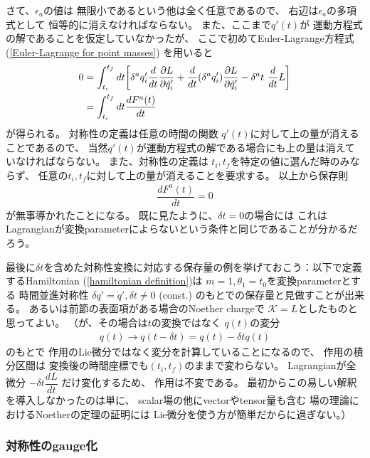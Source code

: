さて、$\epsilon_a$の値は
無限小であるという他は全く任意であるので、
右辺は$\epsilon_a$の多項式として
恒等的に消えなければならない。
また、ここまで$q'(t)$が
運動方程式の解であることを仮定していなかったが、
ここで初めてEuler-Lagrange方程式
(\ref{Euler-Lagrange for point masses})
を用いると
\begin{align}
  0 &=
  \int_{t_i}^{t_f} dt
  \bigg[
    \delta^a q'_i
    \dfrac{d}{dt}
    \dfrac{\partial L}{\partial \dot{q}'_i}
  +
    \dfrac{d}{dt}
    (\delta^a q'_i)
    \dfrac{\partial L}{\partial \dot{q}'_i}
  -
    \delta^a t
    \ 
    \dfrac{d}{dt}
    L
  \bigg]
\notag\\&=
  \int_{t_i}^{t_f} dt
  \dfrac{dF^a(t)}{dt}
\end{align}
が得られる。
対称性の定義は任意の時間の関数
$q'(t)$に対して上の量が消えることであるので、
当然$q'(t)$が運動方程式の解である場合にも上の量は消えていなければならない。
また、対称性の定義は
$t_i, t_f$を特定の値に選んだ時のみならず、
任意の$t_i, t_f$に対して上の量が消えることを要求する。
以上から保存則
\begin{align}
  \dfrac{dF^a(t)}{dt} = 0
\end{align}
が無事導かれたことになる。
既に見たように、$\delta t = 0$の場合には
これはLagrangianが変換parameterによらないという条件と同じであることが分かるだろう。

最後に$\delta t$を含めた対称性変換に対応する保存量の例を挙げておこう：以下で定義するHamiltonian
(\ref{hamiltonian definition})は
$m=1, \theta_1 = t_0$を変換parameterとする
時間並進対称性
$\delta q' = \dot{q}', \delta t \neq 0$ (const.)
のもとでの保存量と見做すことが出来る。
あるいは前節の表面項がある場合のNoether chargeで
$\mathcal{K}=L$としたものと思ってよい。
（が、その場合は$t$の変換ではなく
$q(t)$の変分
\begin{align}
  q(t) \to q(t-\delta t)
  = q(t) - \delta t \dot{q}(t)
\end{align}
のもとで
作用のLie微分ではなく変分を計算していることになるので、
作用の積分区間は
変換後の時間座標でも$(t_i, t_f)$のままで変わらない。
Lagrangianが全微分
$- \delta t \dfrac{d L}{dt}$
だけ変化するため、
作用は不変である。
最初からこの易しい解釈を導入しなかったのは単に、
scalar場の他にvectorやtensor量も含む
場の理論におけるNoetherの定理の証明には
Lie微分を使う方が簡単だからに過ぎない。）

\subsubsection{対称性のgauge化}


